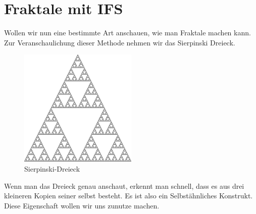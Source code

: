 %
%
%
\section{Fraktale mit IFS 
\label{ifs:section:teil2}}
Wollen wir nun eine bestimmte Art anschauen, wie man Fraktale machen kann.
Zur Veranschaulichung dieser Methode nehmen wir das Sierpinski Dreieck.
\begin{figure}
	\label{ifs:sierpinski10}
	\centering
	\includegraphics[width=0.5\textwidth]{papers/ifs/images/sierpinski}
	\caption{Sierpinski-Dreieck}
\end{figure}
Wenn man das Dreieck genau anschaut, erkennt man schnell, dass es aus drei kleineren Kopien seiner selbst besteht.
Es ist also ein Selbstähnliches Konstrukt.
Diese Eigenschaft wollen wir uns zunutze machen.


